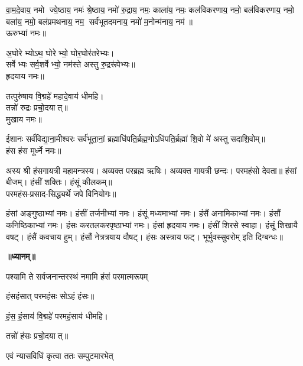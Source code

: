 वा॒म॒दे॒वाय॒ नमो ज्ये॒ष्ठाय॒ नमः॑ श्रे॒ष्ठाय॒ नमो॑ रु॒द्राय॒ नमः॒ काला॑य॒ नमः॒ कल॑विकरणाय॒ नमो॒ बल॑विकरणाय॒ नमो॒ बला॑य॒ नमो॒ बल॑प्रमथनाय॒ नम॒ सर्व॑भूतदमनाय॒ नमो॑ म॒नोन्म॑नाय॒ नम॑॥\\
ऊरुभ्यां नमः॥ 

अ॒घोरेभ्योऽथ॒ घोरेभ्यो॒ घोर॒घोर॑तरेभ्यः।\\
सर्वेभ्यः सर्व॒शर्वेभ्यो॒ नम॑स्ते अस्तु रु॒द्ररू॑पेभ्यः॥\\
हृदयाय नमः॥ 

तत्पुरु॑षाय वि॒द्महे॑ महादे॒वाय॑ धीमहि।\\
तन्नो॑ रुद्रः प्रचो॒दयात्॥\\
मुखाय नमः॥ 

ईशानः सर्व॑विद्या॒ना॒मीश्वरः सर्व॑भूता॒नां॒ ब्रह्माधि॑पति॒र्ब्रह्म॒णो\-ऽधि॑पति॒र्ब्रह्मा॑ शि॒वो मे॑ अस्तु सदाशि॒वोम्॥\\
हंस हंस मूर्ध्ने नमः॥ \\
{\small \closesection}

अस्य श्री हंसगायत्री महामन्त्रस्य। अव्यक्त परब्रह्म ऋषिः। अव्यक्त गायत्री छन्दः। परमहंसो देवता॥ हंसां बीजम्। हंसीं शक्तिः। हंसूं कीलकम्॥\\
परमहंस-प्रसाद-सिद्ध्यर्थे जपे विनियोगः॥

हंसां अङ्गुष्ठाभ्यां नमः।
हंसीं तर्जनीभ्यां नमः।
हंसूं मध्यमाभ्यां नमः।
हंसैं अनामिकाभ्यां नमः।
हंसौं कनिष्ठिकाभ्यां नमः।
हंसः करतलकरपृष्ठाभ्यां नमः।
हंसां हृदयाय नमः।
हंसीं शिरसे स्वाहा।
हंसूं शिखायै वषट्।
हंसैं कवचाय हुम्।
हंसौं नेत्रत्रयाय वौषट्।
हंसः अस्त्राय फट्।
भूर्भुवस्सुवरोम् इति दिग्बन्धः॥

\centerline{\textbf{॥ध्यानम्॥}}
{पश्यामि ते सर्वजनान्तरस्थं नमामि हंसं परमात्मरूपम्}
\smallskip
\centerline{हंसहंसात् परमहंसः सोऽहं हंसः॥}
\smallskip
\centerline{हं॒स॒ हं॒साय॑ वि॒द्महे॑ परमहं॒साय॑ धीमहि।}
\centerline{तन्नो॑ हंसः प्रचो॒दयात्॥ } 
\begin{flushright}
\vspace{-5.7ex}{\small (एवं त्रिः)}
\end{flushright}

{एवं न्यासविधिं कृत्वा ततः सम्पुटमारभेत्}

{\small \closesection}

\newcommand{\indradi}[9]{\refstepcounter{dik}
ॐ भूर्भुव॒ सुव॒रोम्।\\
\lbrack#1\rbrack\  #2। #5।\\#6॥\\%
#2 भूर्भुव॒ सुव॑। #4 #7 साङ्गाय सायुधाय सशक्तिपरिवाराय सर्वालङ्कार\-भूषिताय उमामहेश्वर\-पार्षदाय नमः।\\%
#8दिग्भागे #9 #2 #4 नमः। #3 सुप्रीतो वरदो भवतु॥ \lbrack#3 संरक्षतु॥\rbrack\hfill॥\devanumber{\arabic{dik}}॥}


